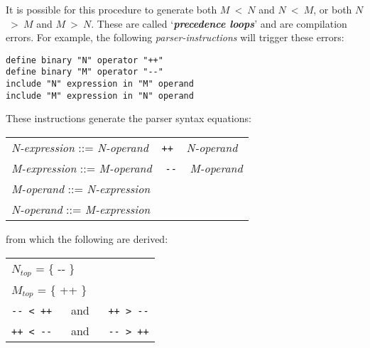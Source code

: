 \documentclass[12pt]{article}
\newcommand{\skey}[2]{{\bf \em #1#2}\index{#1}}
\newenvironment{indpar}[1][0.3in]%
	{\begin{list}{}%
		     {\setlength{\itemsep}{0in}%
		      \setlength{\topsep}{0in}%
		      \setlength{\parsep}{1ex}%
		      \setlength{\labelwidth}{#1}%
		      \setlength{\leftmargin}{#1}%
		      \addtolength{\leftmargin}{\labelsep}}%
	 \item}%
	{\end{list}}
\begin{document}
It is possible for this procedure to generate
both $M$~<~$N$ and $N$~<~$M$, or
both $N$~>~$M$ and $M$~>~$N$.
These are called `\skey{precedence loop}s' and are
compilation errors.  For example, the following
{\em parser-instructions} will trigger these errors:
\begin{indpar}\begin{verbatim}
define binary "N" operator "++"
define binary "M" operator "--"
include "N" expression in "M" operand
include "M" expression in "N" operand
\end{verbatim}\end{indpar}
These instructions generate the parser syntax equations:
\begin{center}
\begin{tabular}{l}
{\em N-expression} ::= {\em N-operand} ~ {\tt ++} ~ {\em N-operand} \\
{\em M-expression} ::= {\em M-operand} ~ {\tt -{}-} ~ {\em M-operand} \\
{\em M-operand} ::= {\em N-expression} \\
{\em N-operand} ::= {\em M-expression} \\
\end{tabular}
\end{center}
from which the following are derived:
\begin{center}
\begin{tabular}{l}
$N_{top}$ = \{ -{}- \} \\
$M_{top}$ = \{ +{}+ \} \\
{\tt -{}- < ++} ~~ and ~~ {\tt ++ > -{}-} \\
{\tt ++ < -{}-} ~~ and ~~ {\tt -{}- > ++} \\
\end{tabular}
\end{center}
\end{document}
